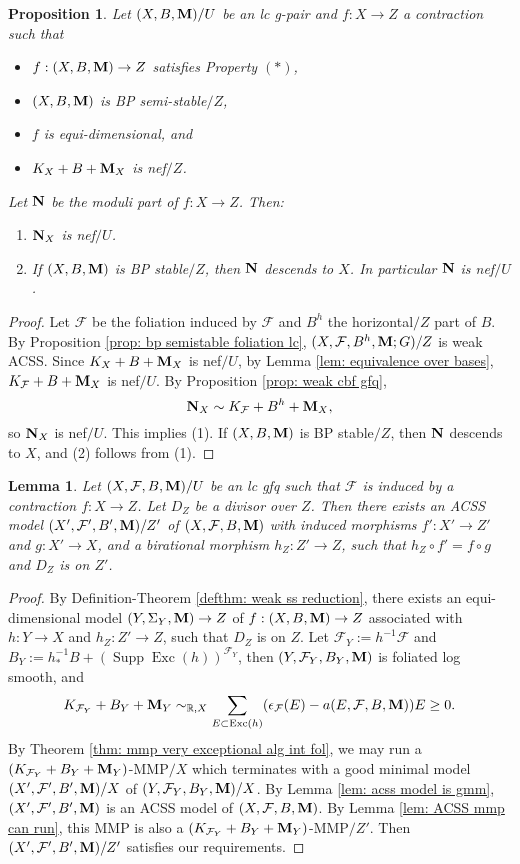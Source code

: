 \documentclass[11pt]{amsart}
\numberwithin{equation}{section}
\newcommand{\Mm}{{\bf{M}}}
\newcommand{\Nn}{{\bf{N}}}
\newcommand{\Exc}{\operatorname{Exc}}
\newcommand{\Supp}{\operatorname{Supp}}
\newcommand{\Ff}{\mathcal{F}}
\newtheorem{lem}[thm]{Lemma}
\newtheorem{prop}[thm]{Proposition}
\theoremstyle{definition}
\theoremstyle{definition}
\theoremstyle{definition}
\begin{document}
\begin{prop}\label{prop: bp stable nef}
    Let $(X,B,\Mm)/U$ be an lc g-pair and $f: X\rightarrow Z$ a contraction such that
    \begin{itemize}
        \item $f: (X,B,\Mm)\rightarrow Z$ satisfies Property $(*)$,
        \item $(X,B,\Mm)$ is BP semi-stable$/Z$,
        \item $f$ is equi-dimensional, and
        \item $K_X+B+\Mm_X$ is nef$/Z$.
    \end{itemize}
    Let $\Nn$ be the moduli part of $f: X\rightarrow Z$. Then:
    \begin{enumerate}
        \item $\Nn_X$ is nef$/U$.
        \item If  $(X,B,\Mm)$ is BP stable$/Z$, then $\Nn$ descends to $X$. In particular $\Nn$ is nef$/U$.
    \end{enumerate}
\end{prop}
\begin{proof}
Let $\Ff$ be the foliation induced by $\Ff$ and $B^h$ the horizontal$/Z$ part of $B$. By Proposition \ref{prop: bp semistable foliation lc}, $(X,\Ff,B^h,\Mm;G)/Z$ is weak ACSS. Since $K_X+B+\Mm_X$ is nef$/U$, by Lemma \ref{lem: equivalence over bases}, $K_{\Ff}+B+\Mm_X$ is nef$/U$. 
By Proposition \ref{prop: weak cbf gfq},
$$\Nn_X\sim K_{\Ff}+B^h+\Mm_X,$$
so $\Nn_X$ is nef$/U$. This implies (1). If $(X,B,\Mm)$ is BP stable$/Z$, then $\Nn$ descends to $X$, and (2) follows from (1).
\end{proof}

\begin{lem}\label{lem: special acss model}
Let $(X,\Ff,B,\Mm)/U$ be an lc gfq such that $\Ff$ is induced by a contraction $f: X\rightarrow Z$. Let $D_Z$ be a divisor over $Z$. Then there exists an ACSS model $(X',\Ff',B',\Mm)/Z'$ of $(X,\Ff,B,\Mm)$ with induced morphisms $f': X'\rightarrow Z'$ and $g: X'\rightarrow X$, and a birational morphism $h_Z: Z'\rightarrow Z$, such that $h_Z\circ f'=f\circ g$ and $D_Z$ is on $Z'$.
\end{lem}
\begin{proof}
By Definition-Theorem \ref{defthm: weak ss reduction}, there exists an equi-dimensional model $(Y,\Sigma_Y,\Mm)\rightarrow Z$ of $f: (X,B,\Mm)\rightarrow Z$ associated with $h: Y\rightarrow X$ and $h_Z: Z'\rightarrow Z$, such that $D_Z$ is on $Z$. Let $\Ff_Y:=h^{-1}\Ff$ and $B_Y:=h^{-1}_*B+(\Supp\Exc(h))^{\Ff_Y}$, then $(Y,\Ff_Y,B_Y,\Mm)$ is foliated log smooth, and
$$K_{\Ff_Y}+B_Y+\Mm_Y\sim_{\mathbb R,X}\sum_{E\subset\Exc(h)}(\epsilon_{\Ff}(E)-a(E,\Ff,B,\Mm))E\geq 0.$$
By Theorem \ref{thm: mmp very exceptional alg int fol}, we may run a $(K_{\Ff_Y}+B_Y+\Mm_Y)$-MMP$/X$ which terminates with a good minimal model $(X',\Ff',B',\Mm)/X$ of $(Y,\Ff_Y,B_Y,\Mm)/X$. By Lemma \ref{lem: acss model is gmm}, $(X',\Ff',B',\Mm)$ is an ACSS model of $(X,\Ff,B,\Mm)$. By Lemma \ref{lem: ACSS mmp can run}, this MMP is also a $(K_{\Ff_Y}+B_Y+\Mm_Y)$-MMP$/Z'$. Then $(X',\Ff',B',\Mm)/Z'$ satisfies our requirements.
\end{proof}
\end{document}
